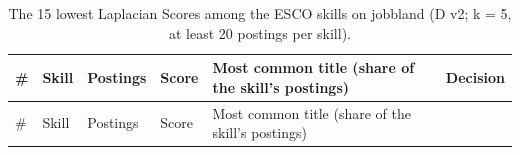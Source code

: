 \documentclass[
  letterpaper,
  DIV=11,
  numbers=noendperiod,
  sfdefaults=false]{scrartcl}
\begin{document}
\begin{longtable}[]{@{}
  >{\raggedright\arraybackslash}p{}
  >{\raggedright\arraybackslash}p{}
  >{\raggedright\arraybackslash}p{}
  >{\raggedright\arraybackslash}p{}
  >{\raggedright\arraybackslash}p{}
  >{\raggedright\arraybackslash}p{}@{}}
\caption{The 15 lowest Laplacian Scores among the ESCO skills on
jobbland (D v2; k = 5, at least 20 postings per
skill).}\label{tbl-ls-lowest}\tabularnewline
\toprule\noalign{}
\begin{minipage}[b]{\linewidth}\raggedright
\#
\end{minipage} & \begin{minipage}[b]{\linewidth}\raggedright
Skill
\end{minipage} & \begin{minipage}[b]{\linewidth}\raggedright
Postings
\end{minipage} & \begin{minipage}[b]{\linewidth}\raggedright
Score
\end{minipage} & \begin{minipage}[b]{\linewidth}\raggedright
Most common title (share of the skill's postings)
\end{minipage} & \begin{minipage}[b]{\linewidth}\raggedright
Decision
\end{minipage} \\
\midrule\noalign{}
\endfirsthead
\toprule\noalign{}
\begin{minipage}[b]{\linewidth}\raggedright
\#
\end{minipage} & \begin{minipage}[b]{\linewidth}\raggedright
Skill
\end{minipage} & \begin{minipage}[b]{\linewidth}\raggedright
Postings
\end{minipage} & \begin{minipage}[b]{\linewidth}\raggedright
Score
\end{minipage} & \begin{minipage}[b]{\linewidth}\raggedright
Most common title (share of the skill's postings)
\end{minipage} & \begin{minipage}[b]{\linewidth}\raggedright

\end{minipage}
\end{longtable}
\end{document}
